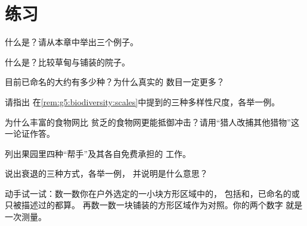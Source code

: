 \section{练习}

\begin{exercise}[$\star$]\label{exo:g5:biodiversity:1}
什么是？请从本章中举出三个例子。
\end{exercise}

\begin{exercise}[$\star$]\label{exo:g5:biodiversity:2}
什么是？比较草甸与铺装的院子。
\end{exercise}

\begin{exercise}[$\star$]\label{exo:g5:biodiversity:3}
目前已命名的大约有多少种？为什么真实的
数目一定更多？
\end{exercise}

\begin{exercise}[$\star$]\label{exo:g5:biodiversity:4}
请指出
在\cref{rem:g5:biodiversity:scales}中提到的三种多样性尺度，各举一例。
\end{exercise}

\begin{exercise}[$\star$]\label{exo:g5:biodiversity:5}
为什么丰富的食物网比
贫乏的食物网更能抵御冲击？请用“猎人改捕其他猎物”这一论证作答。
\end{exercise}

\begin{exercise}[$\star$]\label{exo:g5:biodiversity:6}
列出果园里四种“帮手”及其各自免费承担的
工作。
\end{exercise}

\begin{exercise}[$\star$]\label{exo:g5:biodiversity:7}
说出衰退的三种方式，各举一例，
并说明\emph{}是什么意思？
\end{exercise}

\begin{exercise}[$\star$]\label{exo:g5:biodiversity:8}
动手试一试：数一数你在户外选定的一小块方形区域中的，
包括和，已命名的或只被描述过的都算。
再数一数一块铺装的方形区域作为对照。你的两个数字
就是一次测量。
\end{exercise}

